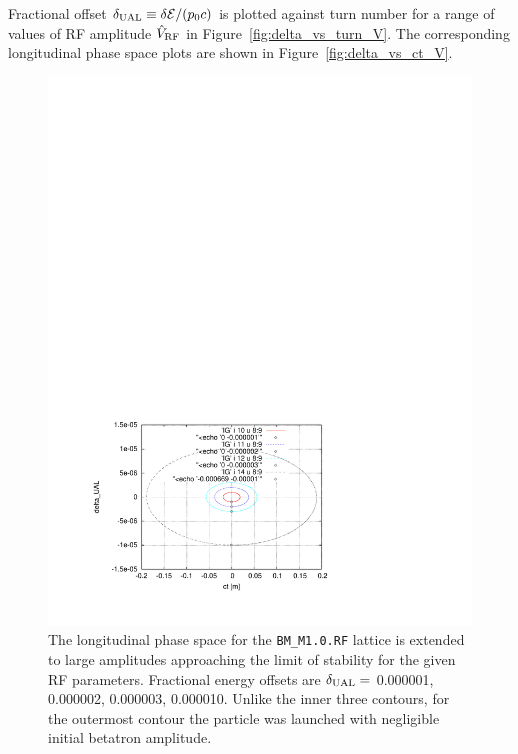 \documentclass[]{article}
\begin{document}
Fractional offset 
$\delta_{\rm UAL}\equiv\delta{\mathcal{E}}/(p_0c)$ is
plotted against turn number for a range of 
values of RF amplitude $\hat V_{\rm RF}$ in 
Figure~\ref{fig:delta_vs_turn_V}.  The corresponding longitudinal
phase space plots are shown in Figure~\ref{fig:delta_vs_ct_V}.
%
\begin{figure}[h]
\centering
\includegraphics[scale=1.0]{pdf/LongitPhSp_BM_M1p0p.pdf}
\caption{\label{fig:LongitPhSp_BM_M1.0}The longitudinal phase space for 
the {\tt BM\_M1.0.RF} lattice is extended to large amplitudes approaching
the limit of stability for the given RF parameters.
Fractional energy offsets are 
$\delta_{\rm UAL}=$ 0.000001, 0.000002, 0.000003, 0.000010. Unlike
the inner three contours, for the outermost contour the particle was 
launched with negligible initial betatron amplitude. 
}
\end{figure}
%
%
\end{document}
